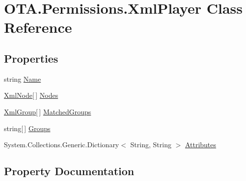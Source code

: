 \hypertarget{class_o_t_a_1_1_permissions_1_1_xml_player}{}\section{O\+T\+A.\+Permissions.\+Xml\+Player Class Reference}
\label{class_o_t_a_1_1_permissions_1_1_xml_player}
\subsection*{Properties}
\begin{DoxyCompactItemize}
\item 
string \hyperlink{class_o_t_a_1_1_permissions_1_1_xml_player_aec1d5ba596f4dbdb42751e9a0bf05089}{Name}
\item 
\hyperlink{class_o_t_a_1_1_permissions_1_1_xml_node}{Xml\+Node}\mbox{[}$\,$\mbox{]} \hyperlink{class_o_t_a_1_1_permissions_1_1_xml_player_a2e8ab55e85850bcfd352238ffe1a97d6}{Nodes}
\item 
\hyperlink{class_o_t_a_1_1_permissions_1_1_xml_group}{Xml\+Group}\mbox{[}$\,$\mbox{]} \hyperlink{class_o_t_a_1_1_permissions_1_1_xml_player_a5f3fffc97a05b0aa4b250657fddb2ec6}{Matched\+Groups}
\item 
string\mbox{[}$\,$\mbox{]} \hyperlink{class_o_t_a_1_1_permissions_1_1_xml_player_ac70426f4b6bdec17a6d4acd242a71f99}{Groups}
\item 
System.\+Collections.\+Generic.\+Dictionary$<$ String, String $>$ \hyperlink{class_o_t_a_1_1_permissions_1_1_xml_player_a5d388f599ba12456f3bedc5ff38b5dd7}{Attributes}
\end{DoxyCompactItemize}


\subsection{Property Documentation}
\hypertarget{class_o_t_a_1_1_permissions_1_1_xml_player_a5d388f599ba12456f3bedc5ff38b5dd7}{}

